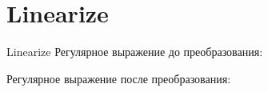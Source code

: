\section{Linearize}
\begin{frame}{Linearize}
	Регулярное выражение до преобразования:

	Регулярное выражение после преобразования:

\end{frame}
